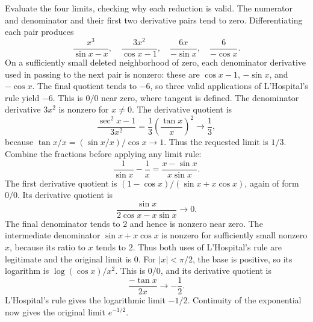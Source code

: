 \goal Evaluate the four limits, checking why each reduction is valid.
The numerator and denominator and their first two derivative pairs tend to zero. Differentiating each pair produces
\[
 \frac{x^3}{\sin x-x},\quad
 \frac{3x^2}{\cos x-1},\quad
 \frac{6x}{-\sin x},\quad
 \frac6{-\cos x}.
\]
On a sufficiently small deleted neighborhood of zero, each denominator derivative used in passing to the next pair is nonzero: these are $\cos x-1$, $-\sin x$, and $-\cos x$. The final quotient tends to $-6$, so three valid applications of L'Hospital's rule yield $-6$.
This is $0/0$ near zero, where tangent is defined. The denominator derivative $3x^2$ is nonzero for $x\ne0$. The derivative quotient is
\[
 \frac{\sec^2x-1}{3x^2}
 =\frac13\left(\frac{\tan x}x\right)^2\longrightarrow\frac13,
\]
because $\tan x/x=(\sin x/x)/\cos x\to1$. Thus the requested limit is $1/3$.
Combine the fractions before applying any limit rule:
\[
 \frac1{\sin x}-\frac1x=\frac{x-\sin x}{x\sin x}.
\]
The first derivative quotient is $(1-\cos x)/(\sin x+x\cos x)$, again of form $0/0$. Its derivative quotient is
\[
 \frac{\sin x}{2\cos x-x\sin x}\longrightarrow0.
\]
The final denominator tends to $2$ and hence is nonzero near zero. The intermediate denominator $\sin x+x\cos x$ is nonzero for sufficiently small nonzero $x$, because its ratio to $x$ tends to $2$. Thus both uses of L'Hospital's rule are legitimate and the original limit is $0$.
For $|x|<\pi/2$, the base is positive, so its logarithm is $\log(\cos x)/x^2$. This is $0/0$, and its derivative quotient is
\[
 \frac{-\tan x}{2x}\longrightarrow-\frac12.
\]
L'Hospital's rule gives the logarithmic limit $-1/2$. Continuity of the exponential now gives the original limit $e^{-1/2}$.

